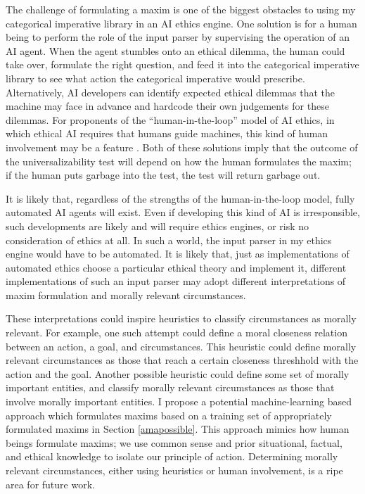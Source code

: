 \begin{isabellebody}
\begin{isamarkuptext}
The challenge of formulating a maxim is one of the biggest obstacles to using my categorical imperative library
in an AI ethics engine. One solution is for a human being to perform the role of the input
parser by supervising the operation of an AI agent. When the agent stumbles onto
an ethical dilemma, the human could take over, formulate
the right question, and feed it into the categorical imperative library to see what action the categorical 
imperative would prescribe. Alternatively, AI developers can identify expected ethical dilemmas 
that the machine may face in advance and hardcode their own judgements for these dilemmas. 
For proponents of the ``human-in-the-loop'' model of AI ethics, in which
ethical AI requires that humans guide machines, this kind of human involvement may be a feature \citep{loop}.
Both of these solutions imply that the outcome of the universalizability test will depend on how the 
human formulates the maxim; if the human puts garbage into the test, the test will return garbage out.

It is likely that, regardless of the strengths of the human-in-the-loop model, fully automated AI 
agents will exist. Even if developing this kind of AI is irresponsible,
such developments are likely and will require ethics engines, or risk no consideration of ethics at all.
In such a world, the input parser in my ethics engine would have to be automated.
It is likely that, just as implementations of automated ethics choose 
a particular ethical theory and implement it, different implementations of such an input parser may 
adopt different interpretations of maxim formulation and morally relevant circumstances. 

These interpretations could inspire heuristics to classify circumstances as morally 
relevant. For example, one such attempt could define a moral closeness relation between an action, a 
goal, and circumstances. This heuristic could define morally relevant circumstances as those that 
reach a certain closeness threshhold with the action and the goal. Another possible heuristic could 
define some set of morally important entities, and classify morally relevant circumstances as those
that involve morally important entities. I propose a potential machine-learning based approach which formulates
maxims based on a training set of appropriately formulated maxims in Section \ref{amapossible}. This 
approach mimics how human beings formulate maxims; we use common sense and prior situational, 
factual, and ethical knowledge to isolate our principle of action. Determining morally relevant circumstances, 
either using heuristics or human involvement, is a ripe area for future work.


\end{isamarkuptext}
\end{isabellebody}
